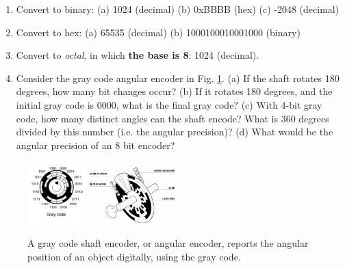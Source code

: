 \documentclass[10pt]{article}
\begin{document}
\begin{enumerate}
\item Convert to binary: (a) 1024 (decimal) (b) 0xBBBB (hex) (c) -2048 (decimal) \\ \vspace{1.5cm}
\item Convert to hex: (a) 65535 (decimal) (b) 1000100010001000 (binary) \\ \vspace{1cm}
\item Convert to \textit{octal}, in which \textbf{the base is 8}: 1024 (decimal). \\ \vspace{1cm}
\item Consider the gray code angular encoder in Fig. \ref{fig:grayCode}.  (a) If the shaft rotates 180 degrees, how many bit changes occur?  (b) If it rotates 180 degrees, and the initial gray code is 0000, what is the final gray code?  (c) With 4-bit gray code, how many distinct angles can the shaft encode?  What is 360 degrees divided by this number (i.e. the angular precision)? (d) What would be the angular precision of an 8 bit encoder? \\ \vspace{2cm}
\end{enumerate}
\begin{figure}[hb]
\centering
\includegraphics[width=0.2\textwidth]{grayCode1.png}
\includegraphics[width=0.3\textwidth]{grayCode2.png}
\caption{\label{fig:grayCode} A gray code shaft encoder, or angular encoder, reports the angular position of an object digitally, using the gray code.}
\end{figure}
\end{document}
